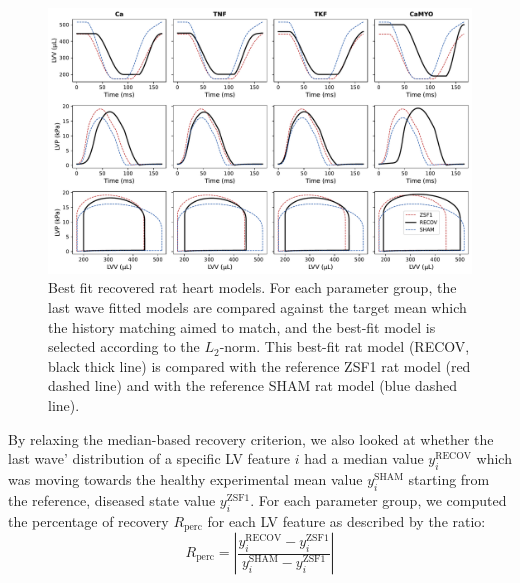 \begin{figure}[!ht]
    \myfloatalign
    \includegraphics[width=\textwidth]{figures/chapter07/Fig_7.pdf}
    \caption{Best fit recovered rat heart models. For each parameter group, the last wave fitted models are compared against the target mean which the history matching aimed to match, and the best-fit model is selected according to the $L_2$-norm. This best-fit rat model (RECOV, black thick line) is compared with the reference ZSF1 rat model (red dashed line) and with the reference SHAM rat model (blue dashed line).}
    \label{fig:bestfits}
\end{figure}

\vspace{0.2cm}
By relaxing the median-based recovery criterion, we also looked at whether the last wave' distribution of a specific LV feature $i$ had a median value $y_{i}^{\textrm{RECOV}}$ which was moving towards the healthy experimental mean value $y_{i}^{\textrm{SHAM}}$ starting from the reference, diseased state value $y_{i}^{\textrm{ZSF1}}$. For each parameter group, we computed the percentage of recovery $R_{\textrm{perc}}$ for each LV feature as described by the ratio:
%
\begin{equation}
    R_{\textrm{perc}} = \left|\frac{y_{i}^{\textrm{RECOV}}-y_{i}^{\textrm{ZSF1}}}{y_{i}^{\textrm{SHAM}}-y_{i}^{\textrm{ZSF1}}}\right|
\end{equation}

